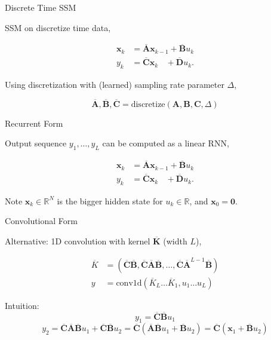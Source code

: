 \documentclass[14pt,aspectratio=169]{beamer}
\begin{document}
\begin{frame}{Discrete Time SSM}

SSM on discretize time data,

\begin{align*}
\boldsymbol{x}_{k} &= \boldsymbol{\overline{A}} \boldsymbol{x}_{k-1} + \boldsymbol{\overline{B}} u_k \\ 
y_k &= \boldsymbol{\overline{C}} \boldsymbol{x}_{k \phantom{- 1}} + \boldsymbol{\overline{D}}  u_k. 
\end{align*}

Using discretization with (learned) sampling rate parameter $\Delta$, 

$$\boldsymbol{\overline{A}}, \boldsymbol{\overline{B}}, \boldsymbol{\overline{C}}  = \text{discretize}(\boldsymbol{A}, \boldsymbol{B}, \boldsymbol{C}, \Delta )$$

\end{frame}

\begin{frame}{Recurrent Form}

Output sequence $y_1, \ldots, y_L$ can be computed as a linear RNN,

\begin{align*}
\boldsymbol{x}_{k} &= \boldsymbol{\overline{A}} \boldsymbol{x}_{k-1} + \boldsymbol{\overline{B}} u_k \\ 
y_k &= \boldsymbol{\overline{C}} \boldsymbol{x}_{k \phantom{- 1}} + \boldsymbol{\overline{D}}  u_k. 
\end{align*}

Note $\boldsymbol{x}_k \in \mathbb{R}^N$ is the bigger hidden state for $u_k \in \mathbb{R}$, and $\boldsymbol{x}_0 = \mathbf{0}$.

\end{frame}

\begin{frame}{Convolutional Form}

Alternative: 1D convolution with kernel $\boldsymbol{\overline{K}}$ (width $L$),

\begin{align*}
\overline{K} &= (\boldsymbol{\overline{C}}\boldsymbol{\overline{B}}, \boldsymbol{\overline{C}}\boldsymbol{\overline{A}}\boldsymbol{\overline{B}}, \dots, \boldsymbol{\overline{C}}\boldsymbol{\overline{A}}^{L-1}\boldsymbol{\overline{B}}) \\
y &= \text{conv1d}(\overline{K}_L \ldots \overline{K}_1, u_1 \ldots u_L)
\end{align*}

Intuition: 
\pause
$$y_1 = \boldsymbol{\overline{C}} \boldsymbol{\overline{B}} u_1$$ 
\pause
$$y_2 = \boldsymbol{\overline{C}} \boldsymbol{\overline{A}} \boldsymbol{\overline{B}} u_1 + \boldsymbol{\overline{C}} \boldsymbol{\overline{B}} u_2 = \boldsymbol{\overline{C}} (\boldsymbol{\overline{A}} \boldsymbol{\overline{B}} u_1 + \boldsymbol{\overline{B}} u_2) = \boldsymbol{\overline{C}} (\boldsymbol{x}_1 + \boldsymbol{\overline{B}} u_2) $$
\end{frame}
\end{document}
